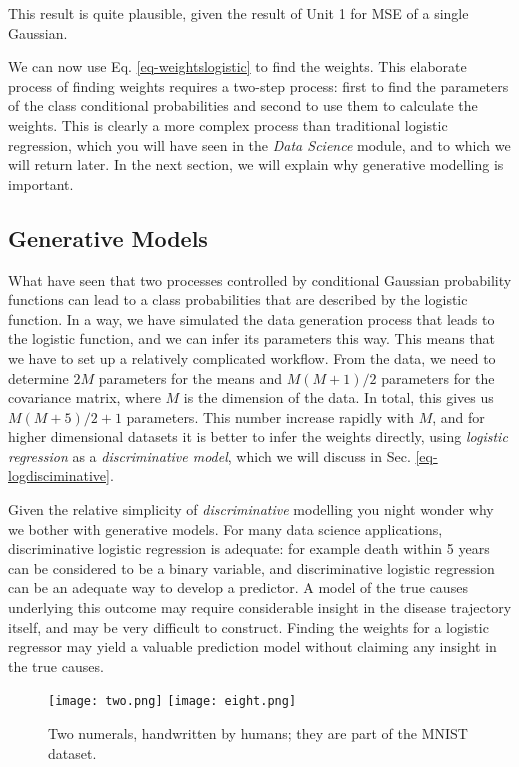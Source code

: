 This result is quite plausible, given the result of Unit 1 for MSE of a single Gaussian.

We can now use Eq. \ref{eq-weightslogistic} to find the weights. This elaborate process of finding weights requires a two-step process: first to find the
parameters of the class conditional probabilities and second to use them to calculate the weights. This is clearly a more complex process
than traditional logistic regression, which you will have seen in the \emph{Data Science} module, and to which we will return later.
In the next section, we will explain why generative modelling is important.

\subsection{Generative Models}
\label{sec-genconseq}
What have seen that two processes controlled by conditional Gaussian probability functions can lead to a class probabilities
that are described by the logistic function. In a way, we have simulated the data generation process that leads to the logistic function, and
we can infer its parameters this way.
This means that we have to set up a relatively complicated
workflow. From the data, we need to determine $2M$ parameters for the means and $M(M+1)/2$ parameters for the covariance matrix, where $M$ is the dimension
of the data. In total, this gives us $M(M+5)/2 +1$ parameters. This number increase rapidly with $M$, and for higher dimensional datasets it is better
to infer the weights directly, using \emph{logistic regression} as a \emph{discriminative model}, which we will discuss in Sec. \ref{eq-logdisciminative}.

Given the relative simplicity of \emph{discriminative} modelling you night wonder why we bother with generative models. For many data science applications, discriminative
logistic regression is adequate: for example death within 5 years can be considered to be a binary variable, and discriminative logistic regression
can be an adequate way to develop a predictor. A model of the true causes underlying this outcome may require considerable insight in the disease trajectory itself, and
may be very difficult to construct. Finding the weights for a logistic regressor may yield a valuable prediction model without claiming any insight in the true causes.

\begin{figure}
  \begin{center}
    \texttt{[image: two.png]}
    \texttt{[image: eight.png]}
  \end{center}
  \caption{Two numerals, handwritten by humans; they are part of the MNIST dataset.}
  \label{fig-mnist}
\end{figure}

